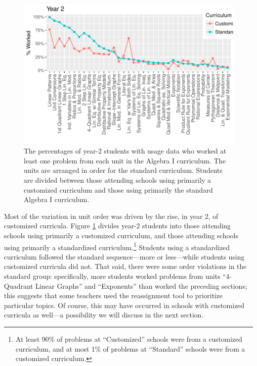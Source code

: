 \documentclass[12pt]{article}\usepackage[]{graphicx}\usepackage[]{color}
\makeatletter
\def\maxwidth{ %
  \ifdim\Gin@nat@width>\linewidth
    \linewidth
  \else
    \Gin@nat@width
  \fi
}
\makeatother
\begin{document}
\begin{figure}
  \centering

\includegraphics[width=\maxwidth]{figure/unitsWorkedCust-1} 

\caption{The percentages of year-2 students with usage data who worked at
  least one problem from each unit in the Algebra I curriculum. The
  units are arranged in order for the standard curriculum. Students
  are divided between those attending schools using primarily a customized
  curriculum and those using primarily the standard Algebra I curriculum.}
\label{fig:unitsWorkedCust}
\end{figure}

Most of the variation in unit order was driven by the rise, in year 2,
of customized curricula.
Figure \ref{fig:unitsWorkedCust} divides year-2 students into those
attending schools using primarily a customized curriculum, and those
attending schools using primarily a standardized
curriculum.\footnote{At least
  90\% of
  problems at ``Customized'' schools were from a customized curriculum,
  and at most
  1\% of
  problems at ``Standard'' schools were from a customized curriculum.}
Students using a standardized curriculum followed the standard
sequence---more or less---while students using customized curricula
did not.
That said, there were some order violations in the standard group:
specifically, more students worked problems from units ``4-Quadrant
Linear Graphs'' and ``Exponents'' than worked the preceding sections;
this suggests that some teachers used the reassignment tool to
prioritize particular topics.
Of course, this may have occurred in schools with customized
curricula as well---a possibility we will discuss in the next
section.
\end{document}
